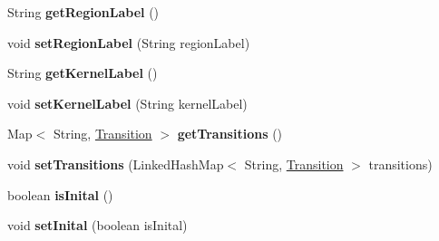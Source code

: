\begin{DoxyCompactItemize}
\item 
\hypertarget{classese_1_1seas_1_1upenn_1_1edu_1_1_state_a54e81964af8ace7a52f049cb18b739a9}{}String {\bfseries get\+Region\+Label} ()\label{classese_1_1seas_1_1upenn_1_1edu_1_1_state_a54e81964af8ace7a52f049cb18b739a9}

\item 
\hypertarget{classese_1_1seas_1_1upenn_1_1edu_1_1_state_aeaa23bcd638d8771032963a71e1100ee}{}void {\bfseries set\+Region\+Label} (String region\+Label)\label{classese_1_1seas_1_1upenn_1_1edu_1_1_state_aeaa23bcd638d8771032963a71e1100ee}

\item 
\hypertarget{classese_1_1seas_1_1upenn_1_1edu_1_1_state_a91db5f49031a058a349fbec466a4af29}{}String {\bfseries get\+Kernel\+Label} ()\label{classese_1_1seas_1_1upenn_1_1edu_1_1_state_a91db5f49031a058a349fbec466a4af29}

\item 
\hypertarget{classese_1_1seas_1_1upenn_1_1edu_1_1_state_a7e3024a79defcd36529d048f3862a9c7}{}void {\bfseries set\+Kernel\+Label} (String kernel\+Label)\label{classese_1_1seas_1_1upenn_1_1edu_1_1_state_a7e3024a79defcd36529d048f3862a9c7}

\item 
\hypertarget{classese_1_1seas_1_1upenn_1_1edu_1_1_state_ada81ad54ed6e47f678fc64542453ad8d}{}Map$<$ String, \hyperlink{classese_1_1seas_1_1upenn_1_1edu_1_1_transition}{Transition} $>$ {\bfseries get\+Transitions} ()\label{classese_1_1seas_1_1upenn_1_1edu_1_1_state_ada81ad54ed6e47f678fc64542453ad8d}

\item 
\hypertarget{classese_1_1seas_1_1upenn_1_1edu_1_1_state_a408bdbf6b39b1bba4be3e546a0673d98}{}void {\bfseries set\+Transitions} (Linked\+Hash\+Map$<$ String, \hyperlink{classese_1_1seas_1_1upenn_1_1edu_1_1_transition}{Transition} $>$ transitions)\label{classese_1_1seas_1_1upenn_1_1edu_1_1_state_a408bdbf6b39b1bba4be3e546a0673d98}

\item 
\hypertarget{classese_1_1seas_1_1upenn_1_1edu_1_1_state_a79165c8a0e7d44b24de8d7bfcf9946a7}{}boolean {\bfseries is\+Inital} ()\label{classese_1_1seas_1_1upenn_1_1edu_1_1_state_a79165c8a0e7d44b24de8d7bfcf9946a7}

\item 
\hypertarget{classese_1_1seas_1_1upenn_1_1edu_1_1_state_a1d21608fbd6ac74fdc3c052b205d5a24}{}void {\bfseries set\+Inital} (boolean is\+Inital)\label{classese_1_1seas_1_1upenn_1_1edu_1_1_state_a1d21608fbd6ac74fdc3c052b205d5a24}


\end{DoxyCompactItemize}
